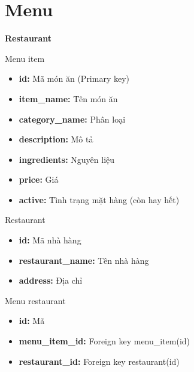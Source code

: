 \documentclass[aspectratio=43,xcolor=dvipsnames]{beamer}
\begin{document}
	\section{Menu}
	\begin{frame}
		\textcolor{structure}{\Huge{\textbf{Restaurant}}}
	\end{frame}
	\begin{frame}{Menu item}
		\begin{itemize}
			\item \textbf{id:} Mã món ăn (Primary key)
			\item \textbf{item\_name:} Tên món ăn
			\item \textbf{category\_name:} Phân loại
			\item \textbf{description:} Mô tả
			\item \textbf{ingredients:} Nguyên liệu
			\item \textbf{price:} Giá
			\item \textbf{active:} Tình trạng mặt hàng (còn hay hết)
		\end{itemize}
	\end{frame}
	
	\begin{frame}{Restaurant}
		\begin{itemize}
			\item \textbf{id: } Mã nhà hàng
			\item \textbf{restaurant\_name:} Tên nhà hàng
			\item \textbf{address:} Địa chỉ
		\end{itemize}
	\end{frame}
	
	\begin{frame}{Menu restaurant}
		\begin{itemize}
			\item \textbf{id: } Mã
			\item \textbf{menu\_item\_id: } Foreign key menu\_item(id)
			\item \textbf{restaurant\_id: } Foreign key restaurant(id)
		\end{itemize}
	\end{frame}
	
\end{document}
